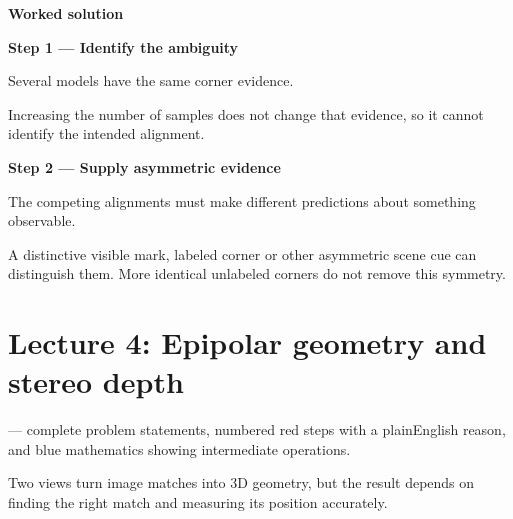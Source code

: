 \documentclass[letterpaper,11pt,english,openany,oneside]{jupyterBook}
\begin{document}
\par\medskip
\textbf{Worked solution}\par\smallskip

\par\medskip{}
{\color{QuizStepRed}\bfseries Step 1 — Identify the ambiguity}\par\smallskip

\sphinxAtStartPar
{} Several models have the same corner evidence.

\sphinxAtStartPar
Increasing the number of samples does not change that evidence, so it cannot identify the intended alignment.

\par

\par\medskip{}
{\color{QuizStepRed}\bfseries Step 2 — Supply asymmetric evidence}\par\smallskip

\sphinxAtStartPar
{} The competing alignments must make different predictions about something observable.

\sphinxAtStartPar
A distinctive visible mark, labeled corner or other asymmetric scene cue can distinguish them. More identical unlabeled corners do not remove this symmetry.

\par

\par\medskip

\sphinxstepscope


\chapter{Lecture 4: Epipolar geometry and stereo depth}
\label{\detokenize{lectures/lecture04/index:lecture-4-epipolar-geometry-and-stereo-depth}}\label{\detokenize{lectures/lecture04/index:lecture04}}\label{\detokenize{lectures/lecture04/index::doc}}
\sphinxAtStartPar
{} — complete problem statements, numbered red steps with a plain\sphinxhyphen{}English reason, and blue mathematics showing intermediate operations.

\sphinxAtStartPar
{} Two views turn image matches into 3D geometry, but the result depends on finding the right match and measuring its position accurately.
\end{document}
